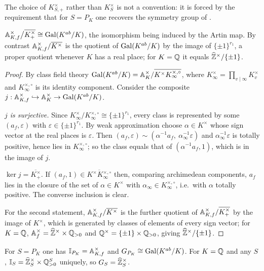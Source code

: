 The choice of $K^\times_{S,+}$ rather than $K^\times_S$ is not a convention: it
is forced by the requirement that for $S=P_K$ one recovers the symmetry group
of \cite{HP,LLN}.

\begin{lemma}\label{Main:lem:gal}
$\mathbb{A}_{K,f}^\times\big/\overline{K^\times_+}\cong\operatorname{Gal}(K^{ab}/K)$, the isomorphism
being induced by the Artin map. By contrast
$\mathbb{A}_{K,f}^\times/\overline{K^\times}$ is the quotient of
$\operatorname{Gal}(K^{ab}/K)$ by the image of $\{\pm1\}^{r_1}$, a proper quotient whenever $K$ has a
real place; for $K=\mathbb{Q}$ it equals $\widehat{\mathbb{Z}}^\times/\{\pm1\}$.
\end{lemma}

\begin{proof}
By class field theory $\operatorname{Gal}(K^{ab}/K)=\mathbb{A}_K^\times/\overline{K^\times K_\infty^{\times,\circ}}$,
where $K_\infty^\times=\prod_{v\mid\infty}K_v^\times$ and $K_\infty^{\times,\circ}$
is its identity component. Consider the composite
$j:\mathbb{A}_{K,f}^\times\hookrightarrow\mathbb{A}_K^\times\to\operatorname{Gal}(K^{ab}/K)$.

\emph{$j$ is surjective.} Since $K_\infty^\times/K_\infty^{\times,\circ}\cong\{\pm1\}^{r_1}$,
every class is represented by some $(a_f,\varepsilon)$ with
$\varepsilon\in\{\pm1\}^{r_1}$. By weak approximation choose
$\alpha\in K^\times$ whose sign vector at the real places is $\varepsilon$.
Then $(a_f,\varepsilon)\sim(\alpha^{-1}a_f,\ \alpha_\infty^{-1}\varepsilon)$
and $\alpha_\infty^{-1}\varepsilon$ is totally positive, hence lies in
$K_\infty^{\times,\circ}$; so the class equals that of $(\alpha^{-1}a_f,1)$,
which is in the image of $j$.

\emph{$\ker j=\overline{K^\times_+}$.} If $(a_f,1)\in\overline{K^\times K_\infty^{\times,\circ}}$
then, comparing archimedean components, $a_f$ lies in the closure of the set of
$\alpha\in K^\times$ with $\alpha_\infty\in K_\infty^{\times,\circ}$, i.e.\ with
$\alpha$ totally positive. The converse inclusion is clear.

For the second statement, $\mathbb{A}_{K,f}^\times/\overline{K^\times}$ is the further
quotient of $\mathbb{A}_{K,f}^\times/\overline{K^\times_+}$ by the image of $K^\times$,
which is generated by classes of elements of every sign vector; for $K=\mathbb{Q}$,
$\mathbb{A}_f^\times=\widehat{\mathbb{Z}}^\times\times\mathbb{Q}_{>0}$ and $\mathbb{Q}^\times=\{\pm1\}\times\mathbb{Q}_{>0}$,
giving $\widehat{\mathbb{Z}}^\times/\{\pm1\}$.
\end{proof}

\begin{corollary}\label{Main:cor:GSfull}
For $S=P_K$ one has $\mathbb{I}_{P_K}=\mathbb{A}_{K,f}^\times$ and
$G_{P_K}\cong\operatorname{Gal}(K^{ab}/K)$. For $K=\mathbb{Q}$ and any $S$,
$\mathbb{I}_S=\widehat{\mathbb{Z}}_S^\times\times\mathbb{Q}^S_{>0}$ uniquely, so $G_S=\widehat{\mathbb{Z}}_S^\times$.
\end{corollary}


